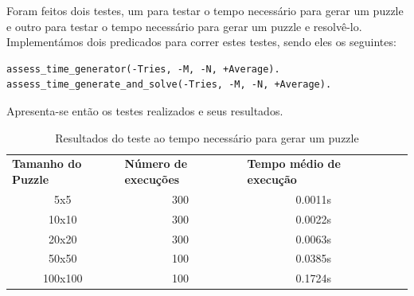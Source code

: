 \documentclass[runningheads,a4paper]{llncs}
\begin{document}
Foram feitos dois testes, um para testar o tempo necessário para gerar um puzzle e outro para testar o tempo necessário para gerar um puzzle e resolvê-lo. Implementámos dois predicados para correr estes testes, sendo eles os seguintes:

\begin{lstlisting}
assess_time_generator(-Tries, -M, -N, +Average).
assess_time_generate_and_solve(-Tries, -M, -N, +Average).
\end{lstlisting}

Apresenta-se então os testes realizados e seus resultados.

\begin{table}[]
\caption{Resultados do teste ao tempo necessário para gerar um puzzle}
\begin{tabular}{cccll}
\multicolumn{1}{l}{\textbf{Tamanho do Puzzle}} & \multicolumn{1}{l}{\textbf{Número de execuções}} & \multicolumn{1}{l}{\textbf{Tempo médio de execução}} &  &  \\
5x5                                            & 300                                              & 0.0011s                                               &  &  \\
10x10                                          & 300                                              & 0.0022s                                               &  &  \\
20x20                                          & 300                                              & 0.0063s                                               &  &  \\
50x50                                          & 100                                              & 0.0385s                                               &  &  \\
100x100                                        & 100                                               & 0.1724s                                               &  & 
\end{tabular}
\end{table}
\end{document}

